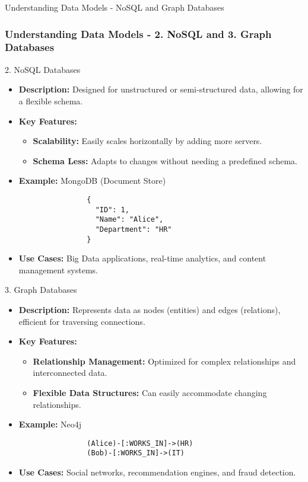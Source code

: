 \documentclass[aspectratio=169]{beamer}
\begin{document}
\begin{frame}[fragile]{Understanding Data Models - NoSQL and Graph Databases}
    \frametitle{Understanding Data Models - 2. NoSQL and 3. Graph Databases}

    \begin{block}{2. NoSQL Databases}
        \begin{itemize}
            \item \textbf{Description:} Designed for unstructured or semi-structured data, allowing for a flexible schema.
            \item \textbf{Key Features:}
                \begin{itemize}
                    \item \textbf{Scalability:} Easily scales horizontally by adding more servers.
                    \item \textbf{Schema Less:} Adapts to changes without needing a predefined schema.
                \end{itemize}
            \item \textbf{Example:} MongoDB (Document Store)
                \begin{lstlisting}
                {
                  "ID": 1,
                  "Name": "Alice",
                  "Department": "HR"
                }
                \end{lstlisting}
            \item \textbf{Use Cases:} Big Data applications, real-time analytics, and content management systems.
        \end{itemize}
    \end{block}
    
    \begin{block}{3. Graph Databases}
        \begin{itemize}
            \item \textbf{Description:} Represents data as nodes (entities) and edges (relations), efficient for traversing connections.
            \item \textbf{Key Features:}
                \begin{itemize}
                    \item \textbf{Relationship Management:} Optimized for complex relationships and interconnected data.
                    \item \textbf{Flexible Data Structures:} Can easily accommodate changing relationships.
                \end{itemize}
            \item \textbf{Example:} Neo4j
                \begin{lstlisting}
                (Alice)-[:WORKS_IN]->(HR)
                (Bob)-[:WORKS_IN]->(IT)
                \end{lstlisting}
            \item \textbf{Use Cases:} Social networks, recommendation engines, and fraud detection.
        \end{itemize}
    \end{block}
\end{frame}
\end{document}

